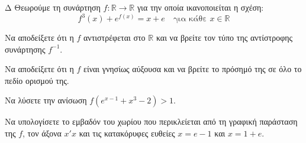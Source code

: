 \begin{thema}{Δ}
Θεωρούμε τη συνάρτηση $f: \mathbb{R} \to \mathbb{R}$ για την οποία ικανοποιείται η σχέση:
\[ f^3(x) + e^{f(x)} = x + e \quad \text{για κάθε } x \in \mathbb{R} \]
\begin{erwthma}
    \item Να αποδείξετε ότι η $f$ αντιστρέφεται στο $\mathbb{R}$ και να βρείτε τον τύπο της αντίστροφης συνάρτησης $f^{-1}$. 
    \item Να αποδείξετε ότι η $f$ είναι γνησίως αύξουσα και να βρείτε το πρόσημό της σε όλο το πεδίο ορισμού της. 
    \item Να λύσετε την ανίσωση $f(e^{x-1} + x^3 - 2) > 1$. 
    \item Να υπολογίσετε το εμβαδόν του χωρίου που περικλείεται από τη γραφική παράσταση της $f$, τον άξονα $x'x$ και τις κατακόρυφες ευθείες $x = e - 1$ και $x = 1+e$. 
\end{erwthma}
\end{thema}
